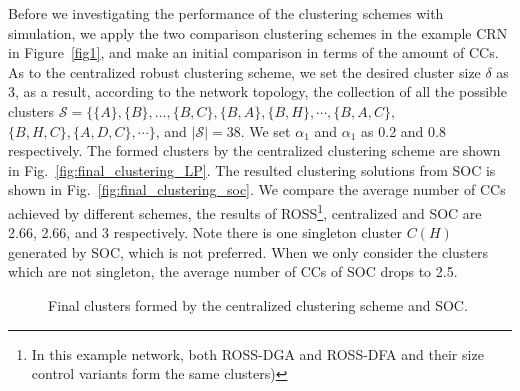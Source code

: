 \documentclass[10pt,journal,compsoc]{IEEEtran}
\theoremstyle{mytheoremstyle}
\theoremstyle{mytheoremstyle}
\theoremstyle{mytheoremstyle}
\begin{document}
Before we investigating the performance of the clustering schemes with simulation, we apply the two comparison clustering schemes in the example CRN in Figure~\ref{fig1}, and make an initial comparison in terms of the amount of CCs. 
As to the centralized robust clustering scheme, we set the desired cluster size $\delta$ as 3, as a result, according to the network topology, the collection of all the possible clusters
$\mathcal{S}=\{\{A\}, \{B\},\dots,\{B,C\},\{B,A\},\{B,H\},\cdots,\{B,A,C\},$\\$\{B,H,C\}, \{A,D,C\},\cdots\}$, and $|\mathcal{S}|=38$.
We set $\alpha_1$ and $\alpha_1$ as 0.2 and 0.8 respectively.
The formed clusters by the centralized clustering scheme are shown in Fig.~\ref{fig:final_clustering_LP}.
The resulted clustering solutions from SOC is shown in Fig.~\ref{fig:final_clustering_soc}.
%
We compare the average number of CCs achieved by different schemes, the results of ROSS\footnote{In this example network, both ROSS-DGA and ROSS-DFA and their size control variants form the same clusters)}, centralized and SOC are 2.66, 2.66, and 3 respectively. 
Note there is one singleton cluster $C(H)$ generated by SOC, which is not preferred.
When we only consider the clusters which are not singleton, the average number of CCs of SOC drops to 2.5. 
\begin{figure}[ht]
\begin{center}
\hspace{0.15 in}
\end{center}
\caption{Final clusters formed by the centralized clustering scheme and SOC.}
\label{fig:final_clustering}
\end{figure}
\end{document}
